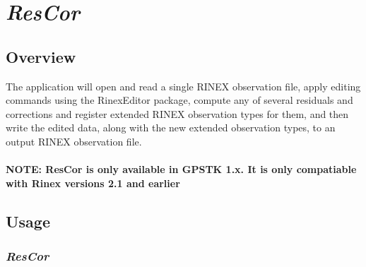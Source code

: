 %
%

\section{\emph{ResCor}}
\subsection{Overview}
The application will open and read a single RINEX observation file, apply editing commands
   using the RinexEditor package, compute any of several residuals and corrections and
   register extended RINEX observation types for them, and then write the edited data,
   along with the new extended observation types, to an output RINEX observation file.
\\
\\
\textbf{NOTE: ResCor is only available in GPSTK 1.x. It is only compatiable with Rinex versions 2.1 and earlier}

\subsection{Usage}
\subsubsection{\emph{ResCor}}

